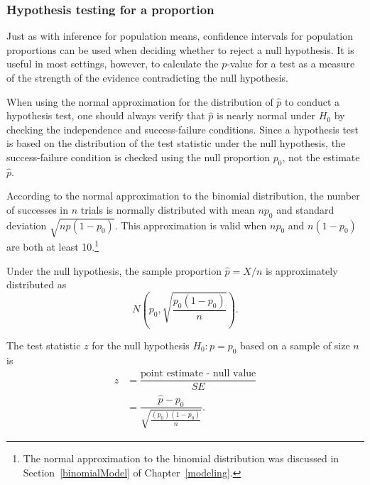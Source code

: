 \subsubsection{Hypothesis testing for a proportion}
\label{htForPropSection}

Just as with inference for population means, confidence intervals for population proportions can be used when deciding whether to reject a null hypothesis. It is useful in most settings, however, to calculate the $p$-value for a test as a measure of the strength of the evidence contradicting the null hypothesis.

When using the normal approximation for the distribution of $\hat{p}$ to conduct a hypothesis test, one should always verify that $\hat{p}$ is nearly normal under $H_0$ by checking the independence and success-failure conditions. Since a hypothesis test is based on the distribution of the test statistic under the null hypothesis, the success-failure condition is checked using the null proportion $p_0$, not the estimate $\hat{p}$. 

According to the normal approximation to the binomial distribution, the number of successes in $n$ trials is normally distributed with mean $np_0$ and standard deviation $\sqrt{np(1-p_0)}$. This approximation is valid when $np_0$ and $n(1-p_0)$ are both at least 10.\footnote{The normal approximation to the binomial distribution was discussed in Section~\ref{binomialModel} of Chapter~\ref{modeling}.} 

Under the null hypothesis, the sample proportion $\hat{p} = X/n$ is approximately distributed as 
\[N \left(p_0, \sqrt{\frac{p_0(1-p_0)}{n}} \right).\]

The test statistic $z$ for the null hypothesis $H_0: p = p_0$ based on a sample of size $n$ is 
\begin{align*}
  z &= \dfrac{\text{point estimate - null value}}{SE} \\
    &= \dfrac{\hat{p} - p_0}{\sqrt{\frac{(p_0)(1-p_0)}{n}}}. 
\end{align*}

